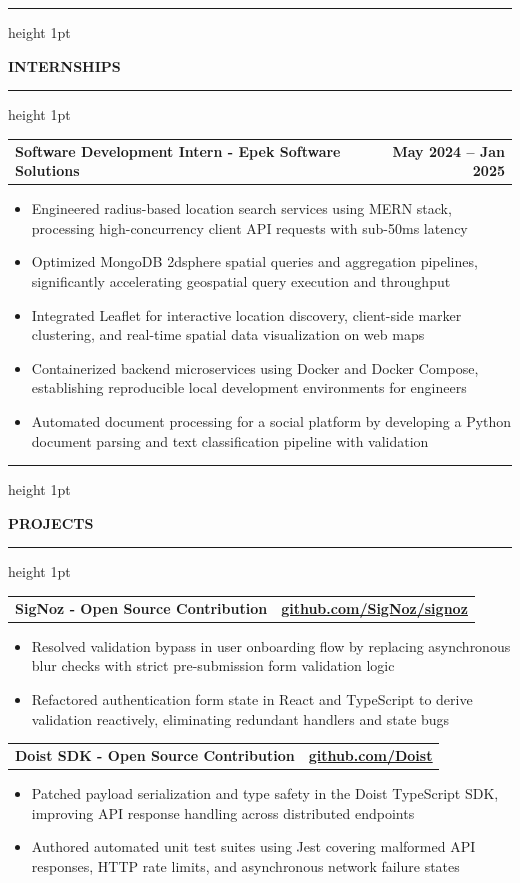 \documentclass[a4paper,10pt]{article}
\makeatletter
\newcommand{\cvsection}[1]{%
  \vspace{0pt}%
  \par\noindent%
  {\color{bordergray}\hrule height 1pt}%
  \par\nobreak\vskip 0pt%
  \begingroup%
  \setlength{\fboxsep}{3.5pt}%
  \colorbox{bannerblue}{\parbox{\dimexpr\textwidth-2\fboxsep\relax}{\centering\textbf{\fontsize{9pt}{10.5pt}\selectfont #1}}}%
  \endgroup%
  \par\nobreak\vskip 0pt%
  {\color{bordergray}\hrule height 1pt}%
  \par\vspace{6.5pt}%
}
\newcommand{\resumeItemHeader}[2]{%
  \vspace{1pt}%
  \noindent%
  \begin{tabular*}{\textwidth}{@{}l@{\extracolsep{\fill}}r@{}}
    \textbf{\fontsize{9pt}{10.5pt}\selectfont #1} & \textbf{\fontsize{9pt}{10.5pt}\selectfont #2} \\
  \end{tabular*}\par\vspace{0pt}%
}
\makeatother
\begin{document}
\cvsection{INTERNSHIPS}

\resumeItemHeader{Software Development Intern - Epek Software Solutions}{May 2024 -- Jan 2025}
\begin{itemize}
    \item Engineered radius-based location search services using MERN stack, processing high-concurrency client API requests with sub-50ms latency
    \item Optimized MongoDB 2dsphere spatial queries and aggregation pipelines, significantly accelerating geospatial query execution and throughput
    \item Integrated Leaflet for interactive location discovery, client-side marker clustering, and real-time spatial data visualization on web maps
    \item Containerized backend microservices using Docker and Docker Compose, establishing reproducible local development environments for engineers
    \item Automated document processing for a social platform by developing a Python document parsing and text classification pipeline with validation
\end{itemize}

\vspace{0.5pt}

\cvsection{PROJECTS}

\resumeItemHeader{SigNoz - Open Source Contribution}{\href{https://github.com/SigNoz/signoz}{\underline{github.com/SigNoz/signoz}}}
\begin{itemize}
    \item Resolved validation bypass in user onboarding flow by replacing asynchronous blur checks with strict pre-submission form validation logic
    \item Refactored authentication form state in React and TypeScript to derive validation reactively, eliminating redundant handlers and state bugs
\end{itemize}

\vspace{0.5pt}

\resumeItemHeader{Doist SDK - Open Source Contribution}{\href{https://github.com/Doist}{\underline{github.com/Doist}}}
\begin{itemize}
    \item Patched payload serialization and type safety in the Doist TypeScript SDK, improving API response handling across distributed endpoints
    \item Authored automated unit test suites using Jest covering malformed API responses, HTTP rate limits, and asynchronous network failure states
\end{itemize}
\end{document}
